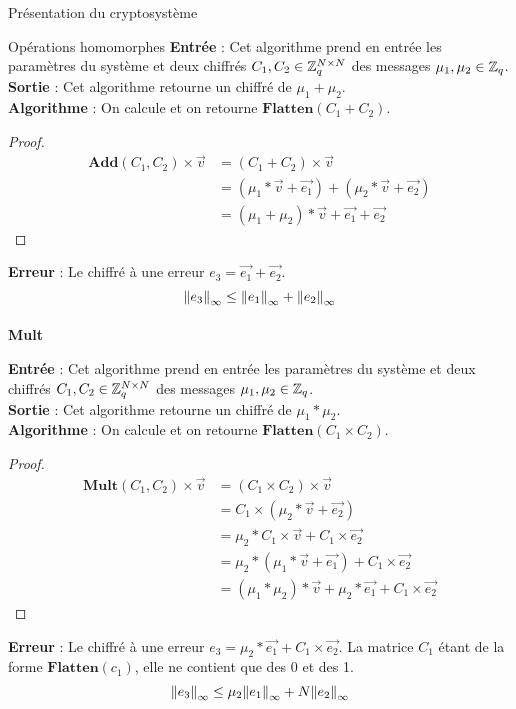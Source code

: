 \begin{section}{Présentation du cryptosystème}
\begin{subsection}{Opérations homomorphes}
	\textbf{Entrée} : Cet algorithme prend en entrée les paramètres du système et deux chiffrés $C_1, C_2 \in \mathbb{Z}_q^{N \times N}$ des messages $\mu_1, \mu_2 \in \mathbb{Z}_q$.\\
	\textbf{Sortie} : Cet algorithme retourne un chiffré de $\mu_1 + \mu_2$.\\
	\textbf{Algorithme} : On calcule et on retourne $\textbf{Flatten}(C_1 + C_2)$.
	\begin{proof}
	\begin{align*}
	\textbf{Add}(C_1, C_2) \times \vec{v} &= (C_1 + C_2) \times \vec{v} \\
	&= (\mu_1 * \vec{v} + \vec{e_1}) + (\mu_2 * \vec{v} + \vec{e_2}) \\
	&= (\mu_1 + \mu_2) * \vec{v} + \vec{e_1} + \vec{e_2}
	\end{align*}
	\end{proof}
\textbf{Erreur} : Le chiffré à une erreur $e_3 = \vec{e_1} + \vec{e_2}$.
\[{\|e_3\|}_{\infty} \leq {\|e_1\|}_{\infty} + {\|e_2\|}_{\infty}\] 
	\paragraph{}
	\textbf{Mult}
	\flushleft
	
	\textbf{Entrée} : Cet algorithme prend en entrée les paramètres du système et deux chiffrés $C_1, C_2 \in \mathbb{Z}_q^{N \times N}$ des messages $\mu_1, \mu_2 \in \mathbb{Z}_q$.\\
	\textbf{Sortie} : Cet algorithme retourne un chiffré de $\mu_1 * \mu_2$. \\
	\textbf{Algorithme} : On calcule et on retourne $\textbf{Flatten}(C_1 \times C_2)$.
	\begin{proof}
	\begin{align*}
	\textbf{Mult}(C_1, C_2) \times \vec{v} &= (C_1 \times C_2) \times \vec{v} \\
	&= C_1 \times (\mu_2 * \vec{v} + \vec{e_2}) \\
	&= \mu_2 * C_1 \times \vec{v} + C_1 \times \vec{e_2} \\
	&= \mu_2 * (\mu_1 * \vec{v} + \vec{e_1}) + C_1 \times \vec{e_2} \\
	&= (\mu_1 * \mu_2) * \vec{v} + \mu_2 * \vec{e_1} + C_1 \times \vec{e_2}
	\end{align*}
	\end{proof}
	\textbf{Erreur} : Le chiffré à une erreur $e_3 = \mu_2 * \vec{e_1} + C_1 \times \vec{e_2}$. La matrice $C_1$ étant de la forme $\textbf{Flatten}(c_1)$, elle ne contient que des 0 et des 1. 
\[{\|e_3\|}_{\infty} \leq \mu_2 {\|e_1\|}_{\infty} + N {\|e_2\|}_{\infty} \]

\end{subsection}
\end{section}
